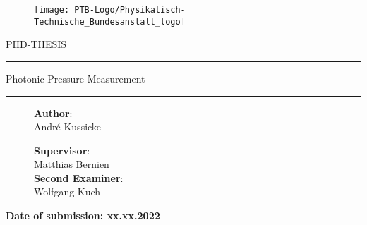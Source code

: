 
\begin{titlepage}
\begin{figure}[ht]
		\centering
		\texttt{[image: PTB-Logo/Physikalisch-Technische\_Bundesanstalt\_logo]}
\end{figure}
\vspace{10mm}

\begin{center}
	\large{PHD-THESIS}
\end{center}

\noindent\rule{\textwidth}{1pt}
\begin{center}
		\Huge{Photonic Pressure Measurement}
\end{center}
\noindent\rule{\textwidth}{1pt}
\vspace{40mm}



\vspace*{0.5cm}

\begin{figure}[!h]
\begin{minipage}[t]{0.5\textwidth}
	\vspace{0pt}
	\textbf{Author}:\\
	André Kussicke
\end{minipage}
\hspace*{3cm}
\begin{minipage}[t]{0.5\textwidth}
	\vspace{0pt}\raggedright
	\textbf{Supervisor}:\\
	Matthias Bernien\\
	\textbf{Second Examiner}:\\
	Wolfgang Kuch
\end{minipage}
\end{figure} 	

\vspace{5cm}
\begin{center}
	\textbf{Date of submission: xx.xx.2022}
\end{center}


\end{titlepage}

\setcounter{page}{1}